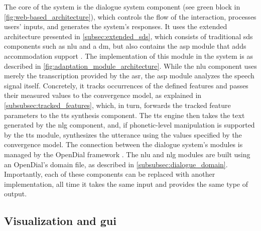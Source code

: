 The core of the system is the dialogue system component (see green block in \cref{fig:web-based_architecture}), which controls the flow of the interaction, processes users' inputs, and generates the system's responses.
It uses the extended architecture presented in \cref{subsec:extended_sds}, which consists of traditional \ac{sds} components such as \ac{nlu} and a \ac{dm}, but also contains the \ac{asp} module that adds accommodation support \citep{Raveh2017SemDial}.
The implementation of this module in the system is as described in \cref{fig:adaptation_module_architecture}.
While the \ac{nlu} component uses merely the transcription provided by the \ac{asr}, the \ac{asp} module analyzes the speech signal itself.
Concretely, it tracks occurrences of the defined features and passes their measured values to the convergence model, as explained in \cref{subsubsec:tracked_features}, which, in turn, forwards the tracked feature parameters to the \ac{tts} synthesis component.
The \ac{tts} engine then takes the text generated by the \ac{nlg} component, and, if phonetic-level manipulation is supported by the \ac{tts} module, synthesizes the utterance using the values specified by the convergence model.
The connection between the dialogue system's modules is managed by the OpenDial framework \citep{Lison2016opendial, Lison2015developing}.
The \ac{nlu} and \ac{nlg} modules are built using an OpenDial's domain file, as described in \cref{subsubsec:dialogue_domain}.
Importantly, each of these components can be replaced with another implementation, all time it takes the same input and provides the same type of output.

\subsection{Visualization and \acl{gui}}
\label{subsec:graphical_user_interface}

